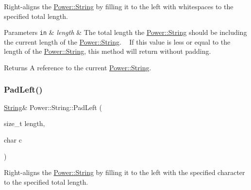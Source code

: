 Right-\/aligns the \hyperlink{class_power_1_1_string}{Power\+::\+String} by filling it to the left with whitespaces to the specified total length. 


\begin{DoxyParams}[1]{Parameters}
\mbox{\tt in}  & {\em length} & The total length the \hyperlink{class_power_1_1_string}{Power\+::\+String} should be including the current length of the \hyperlink{class_power_1_1_string}{Power\+::\+String}. ~\newline
 If this value is less or equal to the length of the \hyperlink{class_power_1_1_string}{Power\+::\+String}, this method will return without padding. \\
\hline
\end{DoxyParams}
\begin{DoxyReturn}{Returns}
A reference to the current \hyperlink{class_power_1_1_string}{Power\+::\+String}. 
\end{DoxyReturn}
\mbox{\label{class_power_1_1_string_aa194605077a9482279c88d7b3726c969}} 
\subsubsection{\texorpdfstring{Pad\+Left()}{PadLeft()}\hspace{0.1cm}{\footnotesize\ttfamily [2/2]}}
{\footnotesize\ttfamily \hyperlink{class_power_1_1_string}{String}\& Power\+::\+String\+::\+Pad\+Left (\begin{DoxyParamCaption}\item[{size\+\_\+t}]{length,  }\item[{char}]{c }\end{DoxyParamCaption})\hspace{0.3cm}{\ttfamily [inline]}}



Right-\/aligns the \hyperlink{class_power_1_1_string}{Power\+::\+String} by filling it to the left with the specified character to the specified total length. 


